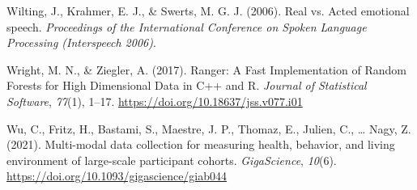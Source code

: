 \documentclass[
  english,
  man,floatsintext]{apa6}
\newlength{\cslhangindent}
\newenvironment{CSLReferences}[2] %
 {%
  \setlength{\parindent}{0pt}
  \ifodd #1 \everypar{\setlength{\hangindent}{\cslhangindent}}\ignorespaces\fi
  \ifnum #2 > 0
  \setlength{\parskip}{#2\baselineskip}
  \fi
 }%
 {}
\begin{document}
\begin{CSLReferences}{1}{0}
\leavevmode{}%
Wilting, J., Krahmer, E. J., \& Swerts, M. G. J. (2006). Real vs. Acted emotional speech. \emph{Proceedings of the International Conference on Spoken Language Processing (Interspeech 2006)}.

\leavevmode{}%
Wright, M. N., \& Ziegler, A. (2017). Ranger: {A Fast Implementation} of {Random Forests} for {High Dimensional Data} in {C}++ and {R}. \emph{Journal of Statistical Software}, \emph{77}(1), 1--17. \url{https://doi.org/10.18637/jss.v077.i01}

\leavevmode{}%
Wu, C., Fritz, H., Bastami, S., Maestre, J. P., Thomaz, E., Julien, C., \ldots{} Nagy, Z. (2021). Multi-modal data collection for measuring health, behavior, and living environment of large-scale participant cohorts. \emph{GigaScience}, \emph{10}(6). \url{https://doi.org/10.1093/gigascience/giab044}

\end{CSLReferences}
\end{document}
